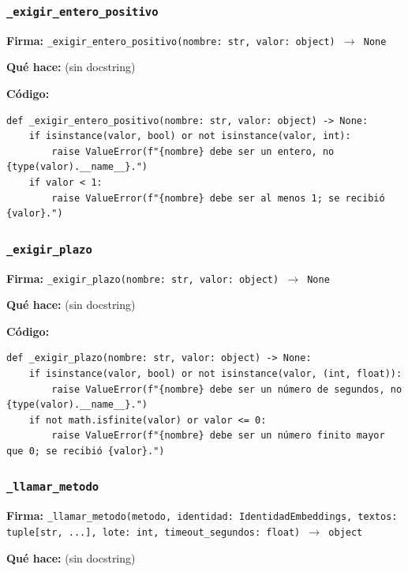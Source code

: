 \documentclass[11pt,a4paper]{article}
\begin{document}
\subsubsection*{\texttt{\_exigir\_entero\_positivo}}
\textbf{Firma:} \texttt{\_exigir\_entero\_positivo(nombre: str, valor: object) $\rightarrow$ None}

\textbf{Qué hace:} (sin docstring)

\textbf{Código:}
\begin{lstlisting}
def _exigir_entero_positivo(nombre: str, valor: object) -> None:
    if isinstance(valor, bool) or not isinstance(valor, int):
        raise ValueError(f"{nombre} debe ser un entero, no {type(valor).__name__}.")
    if valor < 1:
        raise ValueError(f"{nombre} debe ser al menos 1; se recibió {valor}.")
\end{lstlisting}

\subsubsection*{\texttt{\_exigir\_plazo}}
\textbf{Firma:} \texttt{\_exigir\_plazo(nombre: str, valor: object) $\rightarrow$ None}

\textbf{Qué hace:} (sin docstring)

\textbf{Código:}
\begin{lstlisting}
def _exigir_plazo(nombre: str, valor: object) -> None:
    if isinstance(valor, bool) or not isinstance(valor, (int, float)):
        raise ValueError(f"{nombre} debe ser un número de segundos, no {type(valor).__name__}.")
    if not math.isfinite(valor) or valor <= 0:
        raise ValueError(f"{nombre} debe ser un número finito mayor que 0; se recibió {valor}.")
\end{lstlisting}

\subsubsection*{\texttt{\_llamar\_metodo}}
\textbf{Firma:} \texttt{\_llamar\_metodo(metodo, identidad: IdentidadEmbeddings, textos: tuple[str, ...], lote: int, timeout\_segundos: float) $\rightarrow$ object}

\textbf{Qué hace:} (sin docstring)
\end{document}
